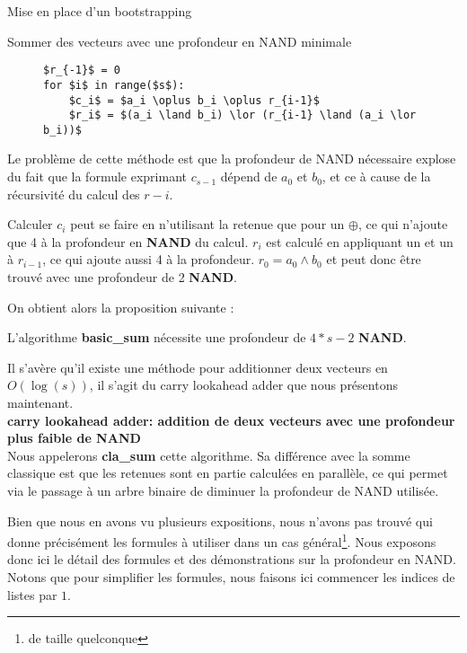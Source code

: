 \begin{section}{Mise en place d'un bootstrapping}
\begin{subsection}{Sommer des vecteurs avec une profondeur en NAND minimale}
\begin{figure}[!h]
\begin{lstlisting}
$r_{-1}$ = 0
for $i$ in range($s$):
	$c_i$ = $a_i \oplus b_i \oplus r_{i-1}$
	$r_i$ = $(a_i \land b_i) \lor (r_{i-1} \land (a_i \lor b_i))$
\end{lstlisting}
\end{figure}

	Le problème de cette méthode est que la profondeur de NAND nécessaire explose du fait que la formule exprimant $c_{s-1}$ dépend de $a_0$ et $b_0$, et ce à cause de la récursivité du calcul des $r-i$.

	Calculer $c_i$ peut se faire en n'utilisant la retenue que pour un $\oplus$, ce qui n'ajoute que 4 à la profondeur en \textbf{NAND} du calcul. $r_i$ est calculé en appliquant un  et un  à $r_{i-1}$, ce qui ajoute aussi 4 à la profondeur. $r_0 = a_0 \land b_0$ et peut donc être trouvé avec une profondeur de 2 \textbf{NAND}.
	
	On obtient alors la proposition suivante :
\begin{prop}
	L'algorithme \textbf{basic\_sum} nécessite une profondeur de $4*s - 2$ \textbf{NAND}.
\end{prop}


Il s'avère qu'il existe une méthode pour additionner deux vecteurs 
en $O(\log(s))$, il s'agit du carry lookahead adder que nous présentons maintenant. \\

\textbf{carry lookahead adder: addition de deux vecteurs avec une profondeur plus faible de
NAND} \\

Nous appelerons \textbf{cla\_sum} cette algorithme.
Sa différence avec la somme classique est que les retenues sont en partie 
calculées en parallèle, ce qui permet via le passage à un arbre
binaire de diminuer la profondeur de NAND utilisée.

Bien que nous en avons vu plusieurs expositions, nous n'avons pas 
trouvé qui donne précisément les formules à utiliser dans un cas
général\footnote{de taille quelconque}. Nous exposons donc ici le détail des 
formules et des démonstrations sur la profondeur en NAND. 
Notons que pour simplifier les formules, nous faisons ici commencer les indices
de listes par $1$.



\end{subsection}
\end{section}

